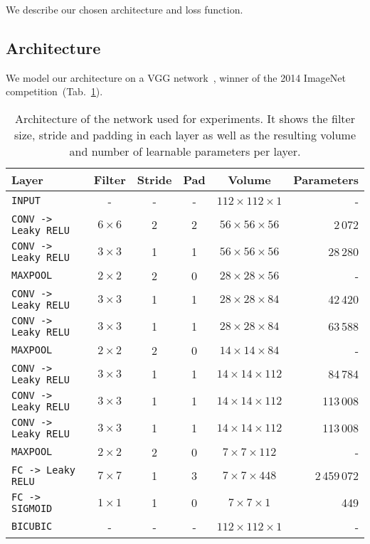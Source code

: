 We describe our chosen architecture and loss function.

\subsection{Architecture}
We model our architecture on a VGG network~\cite{Simonyan2014}, winner of the 2014 ImageNet competition~(Tab.~\ref{tab:convNetArchitecture}).
\begin{table}[h]
	\centering
	\begin{tabular}{lccccr}
	\hline
	\textbf{Layer} & \textbf{Filter} & \textbf{Stride} &\textbf{Pad} & \textbf{Volume} & \textbf{Parameters} \\
	\hline
	\texttt{INPUT}	& -	& - & - & $112 \times 112 \times 1$ & -\\
	\texttt{CONV -> Leaky RELU} & $6 \times 6$ & 2 & 2 & $56 \times 56 \times 56$ & 2\,072\\
	\texttt{CONV -> Leaky RELU} & $3 \times 3$ & 1 & 1 & $56 \times 56 \times 56$ & 28\,280\\
	\texttt{MAXPOOL} & $2 \times 2$ & 2 & 0 & $28 \times 28 \times 56$ & -\\
	\texttt{CONV -> Leaky RELU} & $3 \times 3$ & 1 & 1 & $28 \times 28 \times 84$ & 42\,420\\
	\texttt{CONV -> Leaky RELU} & $3 \times 3$ & 1 & 1 & $28 \times 28 \times 84$ & 63\,588\\
	\texttt{MAXPOOL} & $2 \times 2$ & 2 & 0 & $14 \times 14 \times 84$ & -\\
	\texttt{CONV -> Leaky RELU} & $3 \times 3$ & 1 & 1 & $14 \times 14 \times 112$ & 84\,784\\
	\texttt{CONV -> Leaky RELU} & $3 \times 3$ & 1 & 1 & $14 \times 14 \times 112$ & 113\,008\\
	\texttt{CONV -> Leaky RELU} & $3 \times 3$ & 1 & 1 & $14 \times 14 \times 112$ & 113\,008\\
	\texttt{MAXPOOL} & $2 \times 2$ & 2 & 0 & $7 \times 7 \times 112$ & -\\
	\texttt{FC -> Leaky RELU} & $7 \times 7$ & 1 & 3 & $7 \times 7 \times 448$ & 2\,459\,072\\
	\texttt{FC -> SIGMOID} & $1 \times 1$ & 1 & 0 & $7 \times 7 \times 1$ & 449 \\
	\texttt{BICUBIC} & - & - & - & $112 \times 112 \times 1$ & -\\
	\hline
	\end{tabular}
	\caption[Selected convolutional network architecture]{Architecture of the network used for experiments. It shows the filter size, stride and padding in each layer as well as the resulting volume and number of learnable parameters per layer.}
	\label{tab:convNetArchitecture}
\end{table}


